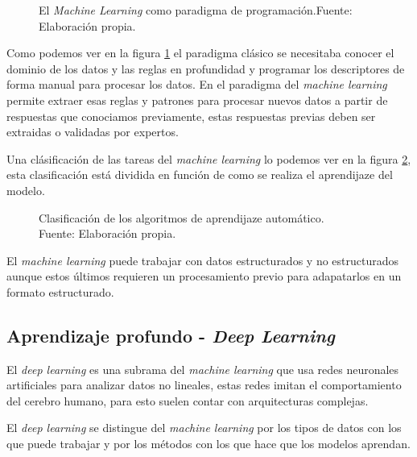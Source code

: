 \begin{figure}[H]
    \centering
    \centerline{}
    \caption{El \textit{Machine Learning} como paradigma de programación.\newline{}Fuente: Elaboración propia.}
    \label{fig:machine-learning-rules}
\end{figure}

Como podemos ver en la figura \ref{fig:machine-learning-rules} el paradigma clásico se necesitaba conocer el dominio de los datos y las reglas en profundidad y programar los descriptores de forma manual para procesar los datos. En el paradigma del \textit{machine learning} permite extraer esas reglas y patrones para procesar nuevos datos a partir de respuestas que conociamos previamente, estas respuestas previas deben ser extraidas o validadas por expertos.

Una clásificación de las tareas del \textit{machine learning} lo podemos ver en la figura \ref{fig:machine-learning}, esta clasificación está dividida en función de como se realiza el aprendijaze del modelo.

\begin{figure}[H]
    \centering
    \centerline{}
    \caption{Clasificación de los algoritmos de aprendijaze automático.\\Fuente: Elaboración propia.}
    \label{fig:machine-learning}
\end{figure}

El \textit{machine learning} puede trabajar con datos estructurados y no estructurados aunque estos últimos requieren un procesamiento previo para adapatarlos en un formato estructurado.



\subsection{Aprendizaje profundo - \textit{Deep Learning}}

El \textit{deep learning} es una subrama del \textit{machine learning} que usa redes neuronales artificiales para analizar datos no lineales, estas redes imitan el comportamiento del cerebro humano, para esto suelen contar con arquitecturas complejas.

El \textit{deep learning} se distingue del \textit{machine learning} por los tipos de datos con los que puede trabajar y por los métodos con los que hace que los modelos aprendan.

